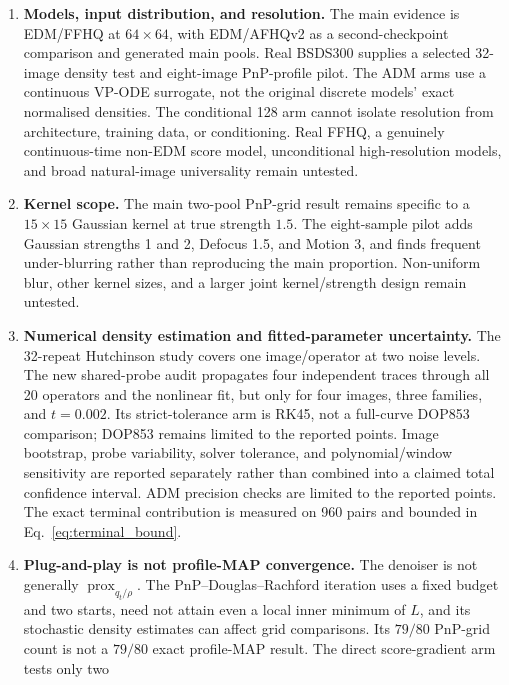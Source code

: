 \documentclass[10pt,journal]{IEEEtran}
\begin{document}
\begin{enumerate}
  \item \textbf{Models, input distribution, and resolution.} The main evidence is EDM/FFHQ at
        $64\times64$, with EDM/AFHQv2 as a second-checkpoint comparison and generated main pools.
        Real BSDS300 supplies a selected 32-image density test and eight-image PnP-profile pilot.
        The ADM arms use a continuous VP-ODE surrogate, not the original discrete models' exact
        normalised densities. The conditional 128 arm cannot isolate resolution from architecture,
        training data, or conditioning. Real FFHQ, a genuinely continuous-time non-EDM score model,
        unconditional high-resolution models, and broad natural-image universality remain untested.
  \item \textbf{Kernel scope.} The main two-pool PnP-grid result remains specific to a
        $15\times15$ Gaussian kernel at true strength $1.5$. The eight-sample pilot adds
        Gaussian strengths 1 and 2, Defocus 1.5, and Motion 3, and finds frequent under-blurring
        rather than reproducing the main proportion. Non-uniform blur, other kernel sizes, and a
        larger joint kernel/strength design remain untested.
  \item \textbf{Numerical density estimation and fitted-parameter uncertainty.} The 32-repeat
        Hutchinson study covers one image/operator at two noise levels. The new shared-probe
        audit propagates four independent traces through all 20 operators and the nonlinear fit,
        but only for four images, three families, and $t=0.002$. Its strict-tolerance arm is
        RK45, not a full-curve DOP853 comparison; DOP853 remains limited to the reported points.
        Image bootstrap, probe variability, solver tolerance, and polynomial/window sensitivity
        are reported separately rather than combined into a claimed total confidence interval.
        ADM precision checks are limited to the reported points. The exact terminal contribution
        is measured on 960 pairs and bounded in Eq.~\eqref{eq:terminal_bound}.
  \item \textbf{Plug-and-play is not profile-MAP convergence.} The denoiser is not generally
        $\operatorname{prox}_{q_t/\rho}$. The PnP--Douglas--Rachford iteration uses a fixed
        budget and two starts, need not attain even a local inner minimum of $L$, and its
        stochastic density estimates can affect grid comparisons. Its $79/80$ PnP-grid count is
        not a $79/80$ exact profile-MAP result. The direct score-gradient arm tests only two

\end{enumerate}
\end{document}
